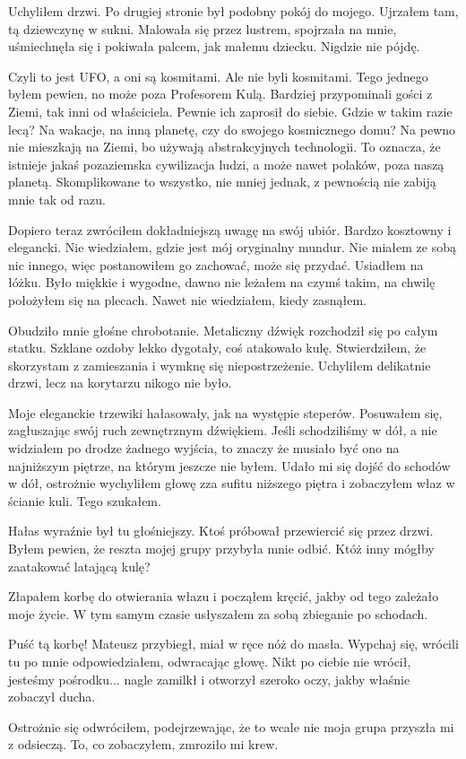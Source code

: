 Uchyliłem drzwi. Po drugiej stronie był podobny pokój do mojego.
Ujrzałem tam, tą dziewczynę w sukni.
Malowała się przez lustrem, spojrzała na mnie, uśmiechnęła się i pokiwała palcem, jak małemu dziecku.
Nigdzie nie pójdę.

Czyli to jest UFO, a oni są kosmitami.
Ale nie byli kosmitami. Tego jednego byłem pewien, no może poza Profesorem Kulą.
Bardziej przypominali gości z Ziemi, tak inni od właściciela. Pewnie ich zaprosił do siebie.
Gdzie w takim razie lecą?
Na wakacje, na inną planetę, czy do swojego kosmicznego domu?
Na pewno nie mieszkają na Ziemi, bo używają abstrakcyjnych technologii.
To oznacza, że istnieje jakaś pozaziemska cywilizacja ludzi, a może nawet polaków, poza naszą planetą.
Skomplikowane to wszystko, nie mniej jednak, z pewnością nie zabiją mnie tak od razu.

Dopiero teraz zwróciłem dokładniejszą uwagę na swój ubiór.
Bardzo kosztowny i elegancki. Nie wiedziałem, gdzie jest mój oryginalny mundur. 
Nie miałem ze sobą nic innego, więc postanowiłem go zachować, może się przydać.
Usiadłem na łóżku. Było miękkie i wygodne, dawno nie leżałem na czymś takim, na chwilę położyłem się na plecach.
Nawet nie wiedziałem, kiedy zasnąłem.

Obudziło mnie głośne chrobotanie. Metaliczny dźwięk rozchodził się po całym statku.
Szklane ozdoby lekko dygotały, coś atakowało kulę.
Stwierdziłem, że skorzystam z zamieszania i wymknę się niepostrzeżenie.
Uchyliłem delikatnie drzwi, lecz na korytarzu nikogo nie było.

Moje eleganckie trzewiki hałasowały, jak na występie steperów.
Posuwałem się, zagłuszając swój ruch zewnętrznym dźwiękiem.
Jeśli schodziliśmy w dół, a nie widziałem po drodze żadnego wyjścia, to znaczy że musiało być ono na najniższym piętrze, na którym jeszcze nie byłem.
Udało mi się dojść do schodów w dół, ostrożnie wychyliłem głowę zza sufitu niższego piętra i zobaczyłem właz w ścianie kuli.
Tego szukałem.

Hałas wyraźnie był tu głośniejszy. Ktoś próbował przewiercić się przez drzwi.
Byłem pewien, że reszta mojej grupy przybyła mnie odbić.
Któż inny mógłby zaatakować latającą kulę?

Złapałem korbę do otwierania włazu i począłem kręcić, jakby od tego zależało moje życie.
W tym samym czasie usłyszałem za sobą zbieganie po schodach.
\begin{dialogue}
\ds{} Puść tą korbę! \dm{} Mateusz przybiegł, miał w ręce nóż do masła.
\ds{} Wypchaj się, wrócili tu po mnie \dm{} odpowiedziałem, odwracając głowę.
\ds{} Nikt po ciebie nie wrócił, jesteśmy pośrodku... \dm{} nagle zamilkł i otworzył szeroko oczy, jakby właśnie zobaczył ducha.
\end{dialogue}
Ostrożnie się odwróciłem, podejrzewając, że to wcale nie moja grupa przyszła mi z odsieczą.
To, co zobaczyłem, zmroziło mi krew.

